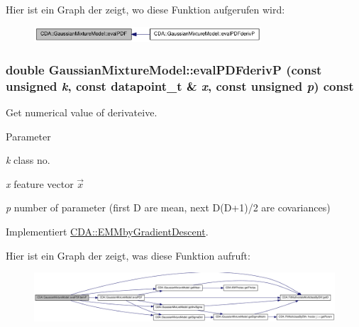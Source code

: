 Hier ist ein Graph der zeigt, wo diese Funktion aufgerufen wird:\nopagebreak
\begin{figure}[H]
\begin{center}
\leavevmode
\includegraphics[width=240pt]{classCDA_1_1GaussianMixtureModel_ad89163c9bc3bdd8565a1fdcd9206d762_icgraph}
\end{center}
\end{figure}


\hypertarget{classCDA_1_1GaussianMixtureModel_a5f05d1d0815a3ba669d442bb560711df}{
\subsubsection[{evalPDFderivP}]{\setlength{\rightskip}{0pt plus 5cm}double GaussianMixtureModel::evalPDFderivP (const unsigned {\em k}, \/  const {\bf datapoint\_\-t} \& {\em x}, \/  const unsigned {\em p}) const}}
\label{classCDA_1_1GaussianMixtureModel_a5f05d1d0815a3ba669d442bb560711df}


Get numerical value of derivateive. 


\begin{DoxyParams}{Parameter}
\item[{\em k}]class no. \item[{\em x}]feature vector $\vec{x}$ \item[{\em p}]number of parameter (first D are mean, next D(D+1)/2 are covariances) \end{DoxyParams}


Implementiert \hyperlink{classCDA_1_1EMMbyGradientDescent}{CDA::EMMbyGradientDescent}.



Hier ist ein Graph der zeigt, was diese Funktion aufruft:\nopagebreak
\begin{figure}[H]
\begin{center}
\leavevmode
\includegraphics[width=420pt]{classCDA_1_1GaussianMixtureModel_a5f05d1d0815a3ba669d442bb560711df_cgraph}
\end{center}
\end{figure}


